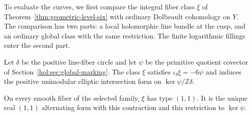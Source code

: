 To evaluate the curves, we first compare the integral fiber class
$\xi$ of Theorem~\ref{thm:geometric-level-six} with ordinary
Dolbeault cohomology on $Y$. The comparison has two parts: a
local holomorphic line bundle at the cusp, and an ordinary global
class with the same restriction. The finite logarithmic fillings
enter the second part.

Let $\delta$ be the positive line-fiber circle and let $\psi$ be
the primitive quotient covector of
Section~\ref{hol:sec:global-marking}.
The class $\xi$ satisfies
$\iota_\delta\xi=-6\psi$ and induces the positive unimodular
elliptic intersection form on $\ker\psi/\mathbb Z\delta$.

\begin{lemma}\label{tc:lem:invariant-type}
On every smooth fiber of the selected family, $\xi$ has type
$(1,1)$. It is the unique real $(1,1)$ alternating form with
this contraction and this restriction to $\ker\psi$.
\end{lemma}

